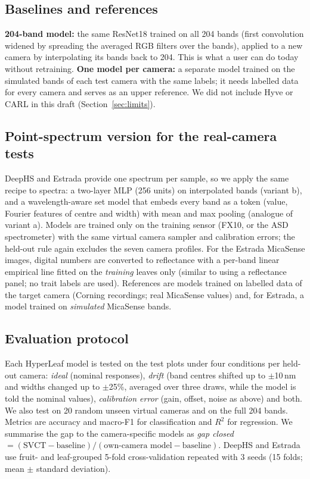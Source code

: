\documentclass[preprint,12pt,authoryear]{elsarticle}
\begin{document}
\subsection{Baselines and references}
\textbf{204-band model:} the same ResNet18 trained on all 204 bands (first convolution widened by spreading the averaged
RGB filters over the bands), applied to a new camera by interpolating its bands back to 204. This is what a user can do
today without retraining. \textbf{One model per camera:} a separate model trained on the simulated bands of each test
camera with the same labels; it needs labelled data for every camera and serves as an upper reference. We did not
include Hyve or CARL in this draft (Section~\ref{sec:limits}).

\subsection{Point-spectrum version for the real-camera tests}
DeepHS and Estrada provide one spectrum per sample, so we apply the same recipe to spectra: a two-layer MLP (256 units)
on interpolated bands (variant b), and a wavelength-aware set model that embeds every band as a token (value, Fourier
features of centre and width) with mean and max pooling (analogue of variant a). Models are trained only on the
training sensor (FX10, or the ASD spectrometer) with the same virtual camera sampler and calibration errors; the
held-out rule again excludes the seven camera profiles. For the Estrada MicaSense images, digital numbers are converted
to reflectance with a per-band linear empirical line fitted on the \emph{training} leaves only (similar to using a
reflectance panel; no trait labels are used). References are models trained on labelled data of the target camera
(Corning recordings; real MicaSense values) and, for Estrada, a model trained on \emph{simulated} MicaSense bands.

\subsection{Evaluation protocol}
Each HyperLeaf model is tested on the test plots under four conditions per held-out camera: \emph{ideal} (nominal
responses), \emph{drift} (band centres shifted up to $\pm$10\,nm and widths changed up to $\pm$25\%, averaged over three
draws, while the model is told the nominal values), \emph{calibration error} (gain, offset, noise as above) and both.
We also test on 20 random unseen virtual cameras and on the full 204 bands. Metrics are accuracy and macro-F1 for
classification and $R^2$ for regression. We summarise the gap to the camera-specific models as
\emph{gap closed} $=(\text{SVCT}-\text{baseline})/(\text{own-camera model}-\text{baseline})$. DeepHS and Estrada use
fruit- and leaf-grouped 5-fold cross-validation repeated with 3 seeds (15 folds; mean $\pm$ standard deviation).
\end{document}
